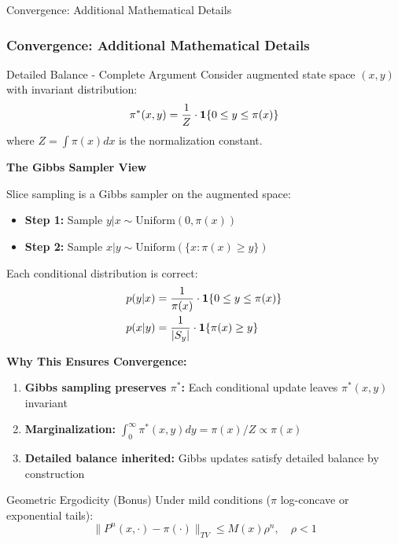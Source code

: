 \documentclass[aspectratio=169]{beamer}
\begin{document}
\begin{frame}{Convergence: Additional Mathematical Details}
	\frametitle{Convergence: Additional Mathematical Details}

	\begin{block}{Detailed Balance - Complete Argument}
		Consider augmented state space $(x, y)$ with invariant distribution:
		$$\pi^*(x, y) = \frac{1}{Z} \cdot \mathbf{1}\{0 \leq y \leq \pi(x)\}$$
		where $Z = \int \pi(x)dx$ is the normalization constant.
	\end{block}

	\textbf{The Gibbs Sampler View}

	Slice sampling is a Gibbs sampler on the augmented space:
	\begin{itemize}
		\item \textbf{Step 1:} Sample $y | x \sim \text{Uniform}(0, \pi(x))$
		\item \textbf{Step 2:} Sample $x | y \sim \text{Uniform}(\{x : \pi(x) \geq y\})$
	\end{itemize}

	Each conditional distribution is correct:
	\begin{align}
		p(y|x) & = \frac{1}{\pi(x)} \cdot \mathbf{1}\{0 \leq y \leq \pi(x)\} \\
		p(x|y) & = \frac{1}{|S_y|} \cdot \mathbf{1}\{\pi(x) \geq y\}
	\end{align}

	\textbf{Why This Ensures Convergence:}
	\begin{enumerate}
		\item \textbf{Gibbs sampling preserves $\pi^*$:} Each conditional update leaves $\pi^*(x,y)$ invariant
		\item \textbf{Marginalization:} $\int_0^\infty \pi^*(x,y)dy = \pi(x)/Z \propto \pi(x)$
		\item \textbf{Detailed balance inherited:} Gibbs updates satisfy detailed balance by construction
	\end{enumerate}

	\begin{block}{Geometric Ergodicity (Bonus)}
		Under mild conditions ($\pi$ log-concave or exponential tails):
		$$\|P^n(x, \cdot) - \pi(\cdot)\|_{TV} \leq M(x)\rho^n, \quad \rho < 1$$
	\end{block}

\end{frame}
\end{document}

